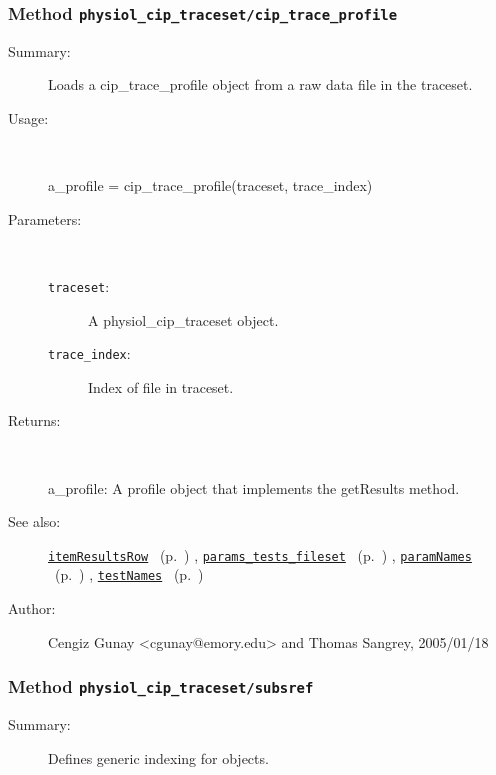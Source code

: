 \subsubsection[Method \texttt{cip\_trace\_profile}]{Method \texttt{physiol\_cip\_traceset/cip\_trace\_profile}}%
%
\label{ref_physiol_cip_traceset__cip_trace_profile}%
\hypertarget{ref_physiol_cip_traceset__cip_trace_profile}{}%
\begin{description}
\item[Summary:]Loads a cip\_trace\_profile object from a raw data file in the traceset.
%
\item[Usage:]~%
\begin{lyxcode}%
a\_profile = cip\_trace\_profile(traceset, trace\_index)
%
\end{lyxcode}%
%
%
\item[Parameters:]~
\begin{description}%
\item[\texttt{traceset}:]
 A physiol\_cip\_traceset object.
\item[\texttt{trace\_index}:]
 Index of file in traceset.
\end{description}%
%
\item[Returns:]~

	a\_profile: A profile object that implements the getResults method.
%
%
\item[See also:]%
\hyperlink{ref_itemResultsRow}{\texttt{itemResultsRow}}%
\ (p.~\pageref{ref_itemResultsRow})%
%
, \hyperlink{ref_params_tests_fileset}{\texttt{params\_tests\_fileset}}%
\ (p.~\pageref{ref_params_tests_fileset})%
%
, \hyperlink{ref_paramNames}{\texttt{paramNames}}%
\ (p.~\pageref{ref_paramNames})%
%
, \hyperlink{ref_testNames}{\texttt{testNames}}%
\ (p.~\pageref{ref_testNames})%
%
%
\item[Author:]%
Cengiz Gunay <cgunay@emory.edu> and Thomas Sangrey, 2005/01/18%
\end{description}
\methodline%
\subsubsection[Method \texttt{subsref}]{Method \texttt{physiol\_cip\_traceset/subsref}}%
%
\label{ref_physiol_cip_traceset__subsref}%
\hypertarget{ref_physiol_cip_traceset__subsref}{}%
\begin{description}
\item[Summary:]Defines generic indexing for objects.
%
%
%
%
%
%
%
%
\end{description}
\methodline%
